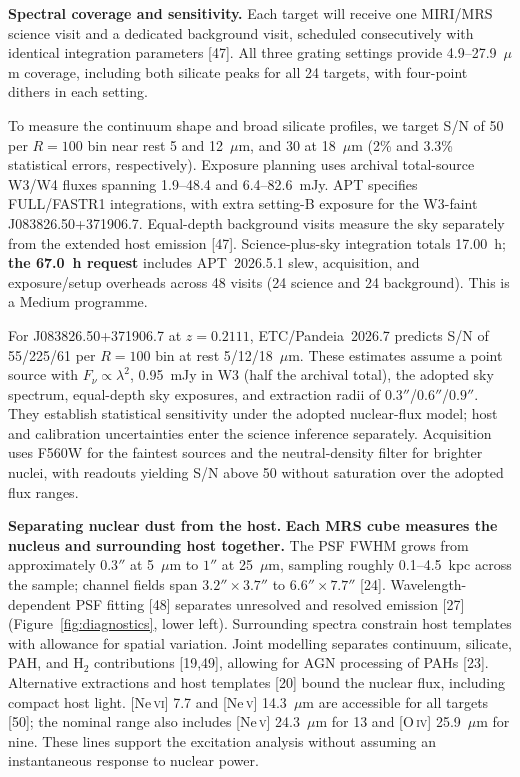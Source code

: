 \documentclass[12pt]{article}
\newcommand{\proposalheading}[1]{%
  \par%
  \noindent\textcolor{sectionblue}{\textbf{#1}}\enspace\ignorespaces}
\begin{document}
\clearpage
\descriptionofobservations

\proposalheading{Spectral coverage and sensitivity.}
Each target will receive one MIRI/MRS science visit and a dedicated background visit, scheduled consecutively with identical integration parameters [47]. All three grating settings provide 4.9--27.9~$\mu$m coverage, including both silicate peaks for all 24 targets, with four-point dithers in each setting.

To measure the continuum shape and broad silicate profiles, we target S/N of 50 per $R=100$ bin near rest 5 and 12~$\mu$m, and 30 at 18~$\mu$m (2\% and 3.3\% statistical errors, respectively). Exposure planning uses archival total-source W3/W4 fluxes spanning 1.9--48.4 and 6.4--82.6~mJy. APT specifies FULL/FASTR1 integrations, with extra setting-B exposure for the W3-faint J083826.50+371906.7. Equal-depth background visits measure the sky separately from the extended host emission [47]. Science-plus-sky integration totals 17.00~h; \textbf{the 67.0~h request} includes APT~2026.5.1 slew, acquisition, and exposure/setup overheads across 48 visits (24 science and 24 background). This is a Medium programme.

For J083826.50+371906.7 at $z=0.2111$, ETC/Pandeia~2026.7 predicts S/N of 55/225/61 per $R=100$ bin at rest 5/12/18~$\mu$m. These estimates assume a point source with $F_\nu\propto\lambda^2$, 0.95~mJy in W3 (half the archival total), the adopted sky spectrum, equal-depth sky exposures, and extraction radii of $0.3''$/$0.6''$/$0.9''$. They establish statistical sensitivity under the adopted nuclear-flux model; host and calibration uncertainties enter the science inference separately. Acquisition uses F560W for the faintest sources and the neutral-density filter for brighter nuclei, with readouts yielding S/N above 50 without saturation over the adopted flux ranges.

\proposalheading{Separating nuclear dust from the host.}
\textbf{Each MRS cube measures the nucleus and surrounding host together.} The PSF FWHM grows from approximately $0.3''$ at 5~$\mu$m to $1''$ at 25~$\mu$m, sampling roughly 0.1--4.5~kpc across the sample; channel fields span $3.2''\!\times3.7''$ to $6.6''\!\times7.7''$ [24]. Wavelength-dependent PSF fitting [48] separates unresolved and resolved emission [27] (Figure~\ref{fig:diagnostics}, lower left). Surrounding spectra constrain host templates with allowance for spatial variation. Joint modelling separates continuum, silicate, PAH, and H$_2$ contributions [19,49], allowing for AGN processing of PAHs [23]. Alternative extractions and host templates [20] bound the nuclear flux, including compact host light. [Ne\,\textsc{vi}] 7.7 and [Ne\,\textsc{v}] 14.3~$\mu$m are accessible for all targets [50]; the nominal range also includes [Ne\,\textsc{v}] 24.3~$\mu$m for 13 and [O\,\textsc{iv}] 25.9~$\mu$m for nine. These lines support the excitation analysis without assuming an instantaneous response to nuclear power.
\end{document}
